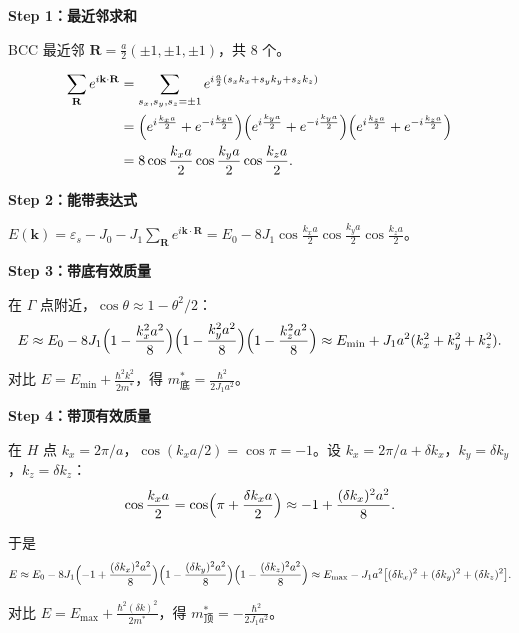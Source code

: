 \begin{derivationbox}
\textbf{Step 1：最近邻求和}

BCC 最近邻 $\mathbf{R}=\frac{a}{2}(\pm1,\pm1,\pm1)$，共 8 个。

\begin{align*}
\sum_{\mathbf{R}}e^{i\mathbf{k}\cdot\mathbf{R}}
&=\sum_{s_x,s_y,s_z=\pm1}e^{i\frac{a}{2}(s_xk_x+s_yk_y+s_zk_z)}\\
&=\Bigl(e^{i\frac{k_xa}{2}}+e^{-i\frac{k_xa}{2}}\Bigr)
\Bigl(e^{i\frac{k_ya}{2}}+e^{-i\frac{k_ya}{2}}\Bigr)
\Bigl(e^{i\frac{k_za}{2}}+e^{-i\frac{k_za}{2}}\Bigr)\\
&=8\cos\frac{k_xa}{2}\cos\frac{k_ya}{2}\cos\frac{k_za}{2}.
\end{align*}

\textbf{Step 2：能带表达式}

$E(\mathbf{k})=\varepsilon_s-J_0-J_1\sum_{\mathbf{R}}e^{i\mathbf{k}\cdot\mathbf{R}}
=E_0-8J_1\cos\frac{k_xa}{2}\cos\frac{k_ya}{2}\cos\frac{k_za}{2}$。

\textbf{Step 3：带底有效质量}

在 $\Gamma$ 点附近，$\cos\theta\approx1-\theta^2/2$：
\[
E\approx E_0-8J_1\Bigl(1-\frac{k_x^2a^2}{8}\Bigr)\Bigl(1-\frac{k_y^2a^2}{8}\Bigr)\Bigl(1-\frac{k_z^2a^2}{8}\Bigr)
\approx E_{\min}+J_1a^2(k_x^2+k_y^2+k_z^2).
\]

对比 $E=E_{\min}+\frac{\hbar^2k^2}{2m^*}$，得 $m^*_{\text{底}}=\frac{\hbar^2}{2J_1a^2}$。

\textbf{Step 4：带顶有效质量}

在 $H$ 点 $k_x=2\pi/a$，$\cos(k_xa/2)=\cos\pi=-1$。设 $k_x=2\pi/a+\delta k_x$，$k_y=\delta k_y$，$k_z=\delta k_z$：
\[
\cos\frac{k_xa}{2}=\cos\Bigl(\pi+\frac{\delta k_x a}{2}\Bigr)\approx-1+\frac{(\delta k_x)^2a^2}{8}.
\]

于是
\[
E\approx E_0-8J_1\Bigl(-1+\frac{(\delta k_x)^2a^2}{8}\Bigr)\Bigl(1-\frac{(\delta k_y)^2a^2}{8}\Bigr)\Bigl(1-\frac{(\delta k_z)^2a^2}{8}\Bigr)
\approx E_{\max}-J_1a^2\bigl[(\delta k_x)^2+(\delta k_y)^2+(\delta k_z)^2\bigr].
\]

对比 $E=E_{\max}+\frac{\hbar^2(\delta k)^2}{2m^*}$，得 $m^*_{\text{顶}}=-\frac{\hbar^2}{2J_1a^2}$。
\end{derivationbox}

\vspace{1em}
